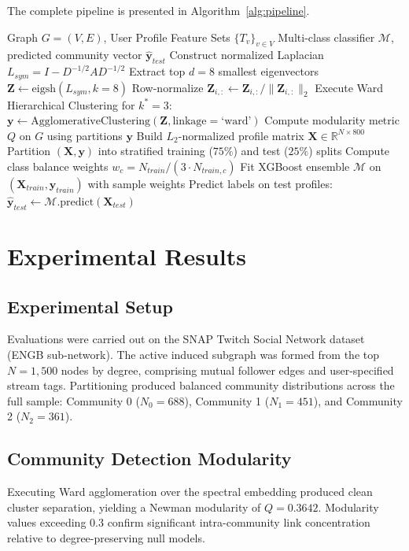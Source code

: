 \documentclass[sn-mathphys,Numbered]{sn-jnl}
\begin{document}
The complete pipeline is presented in Algorithm~\ref{alg:pipeline}.

\begin{algorithm}
\caption{Spectral Hierarchical Community Detection and Profile Attribution Pipeline}\label{alg:pipeline}
\begin{algorithmic}[1]
\Require Graph $G = (V, E)$, User Profile Feature Sets $\{T_v\}_{v \in V}$
\Ensure Multi-class classifier $\mathcal{M}$, predicted community vector $\hat{\mathbf{y}}_{test}$
\State Construct normalized Laplacian $L_{sym} = I - D^{-1/2} A D^{-1/2}$
\State Extract top $d=8$ smallest eigenvectors $\mathbf{Z} \leftarrow \text{eigsh}(L_{sym}, k=8)$
\State Row-normalize $\mathbf{Z}_{i,:} \leftarrow \mathbf{Z}_{i,:} / \|\mathbf{Z}_{i,:}\|_2$
\State Execute Ward Hierarchical Clustering for $k^* = 3$: $\mathbf{y} \leftarrow \text{AgglomerativeClustering}(\mathbf{Z}, \text{linkage}=\text{`ward'})$
\State Compute modularity metric $Q$ on $G$ using partitions $\mathbf{y}$
\State Build $L_2$-normalized profile matrix $\mathbf{X} \in \mathbb{R}^{N \times 800}$
\State Partition $(\mathbf{X}, \mathbf{y})$ into stratified training ($75\%$) and test ($25\%$) splits
\State Compute class balance weights $w_c = N_{train} / (3 \cdot N_{train, c})$
\State Fit XGBoost ensemble $\mathcal{M}$ on $(\mathbf{X}_{train}, \mathbf{y}_{train})$ with sample weights
\State Predict labels on test profiles: $\hat{\mathbf{y}}_{test} \leftarrow \mathcal{M}.\text{predict}(\mathbf{X}_{test})$
\end{algorithmic}
\end{algorithm}

\section{Experimental Results}\label{sec3}

\subsection{Experimental Setup}
Evaluations were carried out on the SNAP Twitch Social Network dataset (ENGB sub-network). The active induced subgraph was formed from the top $N = 1{,}500$ nodes by degree, comprising mutual follower edges and user-specified stream tags. Partitioning produced balanced community distributions across the full sample: Community 0 ($N_0 = 688$), Community 1 ($N_1 = 451$), and Community 2 ($N_2 = 361$)\cite{rozemberczki2021}.

\subsection{Community Detection Modularity}
Executing Ward agglomeration over the spectral embedding produced clean cluster separation, yielding a Newman modularity of $Q = 0.3642$. Modularity values exceeding $0.3$ confirm significant intra-community link concentration relative to degree-preserving null models.
\end{document}
